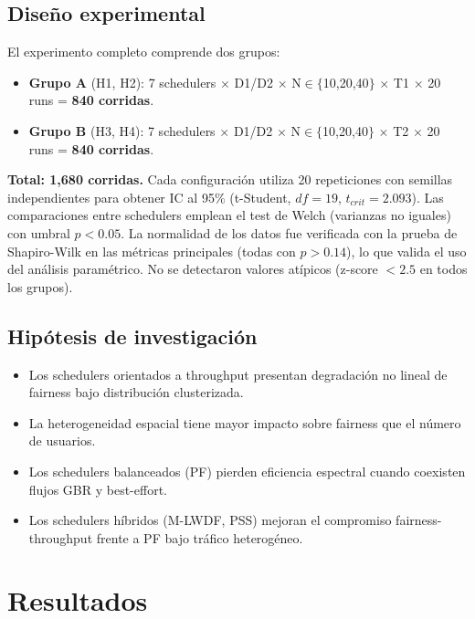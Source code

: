 \documentclass[conference]{IEEEtran}
\begin{document}
\subsection{Diseño experimental}

El experimento completo comprende dos grupos:
\begin{itemize}
  \item \textbf{Grupo A} (H1, H2): 7 schedulers $\times$ D1/D2 $\times$ N$\in\{$10,20,40$\}$ $\times$ T1 $\times$ 20 runs = \textbf{840 corridas}.
  \item \textbf{Grupo B} (H3, H4): 7 schedulers $\times$ D1/D2 $\times$ N$\in\{$10,20,40$\}$ $\times$ T2 $\times$ 20 runs = \textbf{840 corridas}.
\end{itemize}

\textbf{Total: 1{,}680 corridas.} Cada configuración utiliza 20 repeticiones con semillas
independientes para obtener IC al 95\% (t-Student, $df=19$, $t_{crit}=2.093$).
Las comparaciones entre schedulers emplean el test de Welch (varianzas no iguales)
con umbral $p<0.05$. La normalidad de los datos fue verificada con la prueba de
Shapiro-Wilk en las métricas principales (todas con $p>0.14$), lo que valida el uso
del análisis paramétrico. No se detectaron valores atípicos (z-score $<2.5$ en todos
los grupos).

\subsection{Hipótesis de investigación}

\begin{itemize}
  \item[\textbf{H1}:] Los schedulers orientados a throughput presentan degradación no lineal de fairness bajo distribución clusterizada.
  \item[\textbf{H2}:] La heterogeneidad espacial tiene mayor impacto sobre fairness que el número de usuarios.
  \item[\textbf{H3}:] Los schedulers balanceados (PF) pierden eficiencia espectral cuando coexisten flujos GBR y best-effort.
  \item[\textbf{H4}:] Los schedulers híbridos (M-LWDF, PSS) mejoran el compromiso fairness-throughput frente a PF bajo tráfico heterogéneo.
\end{itemize}

\section{Resultados}
\label{sec:resultados}
\end{document}
